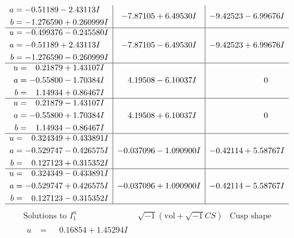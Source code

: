 \documentclass[1p]{elsarticle_modified}
\theoremstyle{definition}
\newcommand{\I}{\sqrt{-1}}
\begin{document}
$$\begin{array}{c|c|c}
\begin{aligned}
a &= -0.51189 - 2.43113 I \\
b &= -1.276590 + 0.260999 I\end{aligned}
 & -7.87105 + 6.49530 I & -9.42523 - 6.99676 I \\ \hline\begin{aligned}
u &= -0.499376 - 0.245580 I \\
a &= -0.51189 + 2.43113 I \\
b &= -1.276590 - 0.260999 I\end{aligned}
 & -7.87105 - 6.49530 I & -9.42523 + 6.99676 I \\ \hline\begin{aligned}
u &= \phantom{-}0.21879 + 1.43107 I \\
a &= -0.55800 - 1.70384 I \\
b &= \phantom{-}1.14934 + 0.86467 I\end{aligned}
 & \phantom{-}4.19508 - 6.10037 I & \phantom{-0.000000 } 0 \\ \hline\begin{aligned}
u &= \phantom{-}0.21879 - 1.43107 I \\
a &= -0.55800 + 1.70384 I \\
b &= \phantom{-}1.14934 - 0.86467 I\end{aligned}
 & \phantom{-}4.19508 + 6.10037 I & \phantom{-0.000000 } 0 \\ \hline\begin{aligned}
u &= \phantom{-}0.324349 + 0.433891 I \\
a &= -0.529747 - 0.426575 I \\
b &= \phantom{-}0.127123 + 0.315352 I\end{aligned}
 & -0.037096 - 1.090900 I & -0.42114 + 5.58767 I \\ \hline\begin{aligned}
u &= \phantom{-}0.324349 - 0.433891 I \\
a &= -0.529747 + 0.426575 I \\
b &= \phantom{-}0.127123 - 0.315352 I\end{aligned}
 & -0.037096 + 1.090900 I & -0.42114 - 5.58767 I\\
 \hline 
 \end{array}$$\newpage$$\begin{array}{c|c|c}  
\text{Solutions to }I^u_{1}& \I (\text{vol} + \sqrt{-1}CS) & \text{Cusp shape}\\
 \hline 
\begin{aligned}
u &= \phantom{-}0.16854 + 1.45294 I \\

\end{aligned}
\end{array}$$
\end{document}

